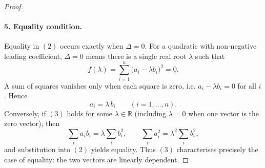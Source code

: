 \begin{proof}
\paragraph{5. Equality condition.}  
Equality in \((2)\) occurs exactly when \(\Delta=0\).  For a quadratic with
non‑negative leading coefficient, \(\Delta=0\) means there is a single real
root \(\lambda\) such that
\[
f(\lambda)=\sum_{i=1}^{n}\bigl(a_i-\lambda b_i\bigr)^{2}=0.
\]
A sum of squares vanishes only when each square is zero, i.e.
\(a_i-\lambda b_i=0\) for all \(i\).  Hence
\begin{equation}
a_i=\lambda\,b_i\qquad(i=1,\dots ,n). \tag{3}
\end{equation}
Conversely, if \((3)\) holds for some \(\lambda\in\mathbb{R}\) (including
\(\lambda=0\) when one vector is the zero vector), then
\[
\sum_{i}a_i b_i=\lambda\sum_{i}b_i^{2},\qquad
\sum_{i}a_i^{2}=\lambda^{2}\sum_{i}b_i^{2},
\]
and substitution into \((2)\) yields equality.  Thus \((3)\) characterises
precisely the case of equality: the two vectors are linearly dependent.

\end{proof}